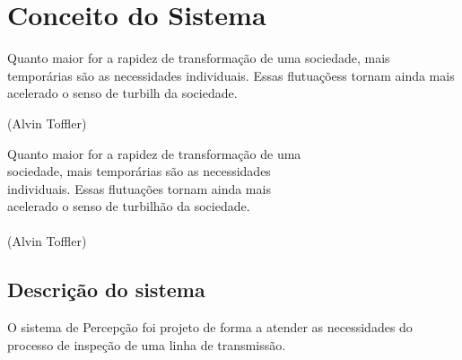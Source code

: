 \chapter{Conceito do Sistema}
\label{chap:concep}

\begin{flushright}

   \begin{list}{}{
      \setlength{\leftmargin}{4.5cm}
      \setlength{\rightmargin}{0cm}
      \setlength{\labelwidth}{0pt}
      \setlength{\labelsep}{\leftmargin}}
      \item Quanto maior for a rapidez de transformação de uma
      sociedade, mais temporárias são as necessidades
      individuais. Essas flutuaçõess tornam ainda mais acelerado
      o senso de turbilh da sociedade.

      \begin{list}{}{
      \setlength{\leftmargin}{0cm}
      \setlength{\rightmargin}{0cm}
      \setlength{\labelwidth}{0pt}
      \setlength{\labelsep}{\leftmargin}}
      \item (Alvin Toffler)
      \end{list}
   \end{list}
\end{flushright}

\begin{flushright}
  Quanto maior for a rapidez de transformação de uma \\
  sociedade, mais temporárias são as necessidades \\
  individuais. Essas flutuações tornam ainda mais \\
  acelerado o senso de turbilhão da sociedade. \\
  \ \\
  (Alvin Toffler)
\end{flushright}


\section{Descrição do sistema}
\label{sec:desc}
O sistema de Percepção foi projeto de forma a atender as necessidades do processo de inspeção de uma linha de transmissão. 

